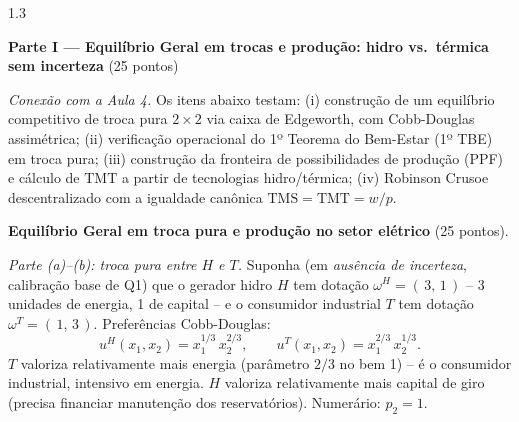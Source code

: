 \documentclass[11pt,addpoints]{exam}
\newcommand{\TMS}{\text{TMS}}
\newcommand{\TMT}{\text{TMT}}
\begin{document}
\begin{spacing}{1.3}

\begin{center}\large\textbf{Parte I --- Equilíbrio Geral em trocas e produção: hidro vs.\ térmica sem incerteza} \quad (25 pontos)\end{center}

\textit{Conexão com a Aula 4.} Os itens abaixo testam: (i) construção de um equilíbrio competitivo de troca pura $2 \times 2$ via caixa de Edgeworth, com Cobb-Douglas assimétrica; (ii) verificação operacional do 1º Teorema do Bem-Estar (1º TBE) em troca pura; (iii) construção da fronteira de possibilidades de produção (PPF) e cálculo de $\TMT$ a partir de tecnologias hidro/térmica; (iv) Robinson Crusoe descentralizado com a igualdade canônica $\TMS = \TMT = w/p$.

\begin{questions}
\question \textbf{Equilíbrio Geral em troca pura e produção no setor elétrico} (25 pontos).

\noindent\emph{Parte (a)--(b): troca pura entre $H$ e $T$.} Suponha (em \emph{ausência de incerteza}, calibração base de Q1) que o gerador hidro $H$ tem dotação $\omega^H = (\,3,\, 1\,)$ -- 3 unidades de energia, 1 de capital -- e o consumidor industrial $T$ tem dotação $\omega^T = (\,1,\, 3\,)$. Preferências Cobb-Douglas:
\[
    u^H(x_1, x_2) = x_1^{1/3}\, x_2^{2/3},\qquad
    u^T(x_1, x_2) = x_1^{2/3}\, x_2^{1/3}.
\]
$T$ valoriza relativamente mais energia (parâmetro $2/3$ no bem 1) -- é o consumidor industrial, intensivo em energia. $H$ valoriza relativamente mais capital de giro (precisa financiar manutenção dos reservatórios). Numerário: $p_2 = 1$.

\end{questions}
\end{spacing}
\end{document}
